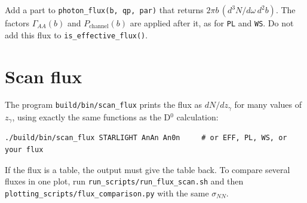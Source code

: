 \documentclass{article}
\begin{document}
Add a part to \texttt{photon\_flux(b, qp, par)} that returns
$2\pi b\,(d^3N/d\omega\,d^2b)$. The factors $\Gamma_{AA}(b)$ and
$P_\text{channel}(b)$ are applied after it, as for \texttt{PL} and
\texttt{WS}. Do not add this flux to \texttt{is\_effective\_flux()}.

\section{Scan flux}\label{sec:checks}


 The program \texttt{build/bin/scan\_flux}
prints the flux as $dN/dz_\gamma$ for many values of $z_\gamma$, using exactly the same
functions as the D$^0$ calculation:
\begin{verbatim}
./build/bin/scan_flux STARLIGHT AnAn An0n     # or EFF, PL, WS, or your flux
\end{verbatim}
If the flux is a table, the output must give the table back. To compare several fluxes in one plot, run
\texttt{run\_scripts/run\_flux\_scan.sh} and then
\texttt{plotting\_scripts/flux\_comparison.py} with the same
$\sigma_{NN}$.
\end{document}
